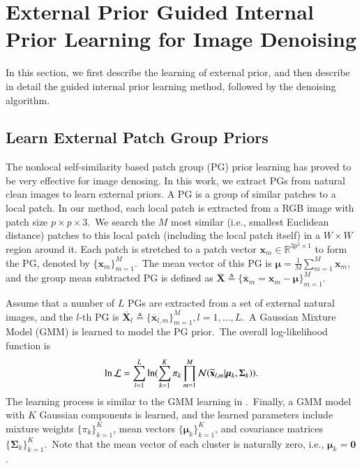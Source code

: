 \section{External Prior Guided Internal Prior Learning for Image Denoising}

In this section, we first describe the learning of external prior, and then describe in detail the guided internal prior learning method, followed by the denoising algorithm.

\subsection{Learn External Patch Group Priors}

The nonlocal self-similarity based patch group (PG) prior learning \cite{pgpd} has proved to be very effective for image denosing. In this work, we extract PGs from natural clean images to learn external priors. A PG is a group of similar patches to a local patch. In our method, each local patch is extracted from a RGB image with patch size $p\times p \times 3$.\ We search the $M$ most similar (i.e., smallest Euclidean distance) patches to this local patch (including the local patch itself) in a $W\times W$ region around it. Each patch is stretched to a patch vector $\mathbf{x}_{m}\in \mathbb{R}^{3p^{2}\times1}$ to form the PG, denoted by $\{\mathbf{x}_{m}\}_{m=1}^{M}$.\ The mean vector of this PG is $\bm{\mu}=\frac{1}{M}\sum_{m=1}^{M}\mathbf{x}_{m}$, and the group mean subtracted PG is defined as $\mathbf{\overline{X}}\triangleq \{\mathbf{\overline{x}}_{m}=\mathbf{x}_{m}-\bm{\mu}\}_{m=1}^{M}$.

Assume that a number of $L$ PGs are extracted from a set of external natural images, and the $l$-th PG is $\mathbf{\overline{X}}_{l}\triangleq \{\mathbf{\overline{x}}_{l,m}\}_{m=1}^{M}, l=1,...,L$.\ A Gaussian Mixture Model (GMM) is learned to model the PG prior.\ The overall log-likelihood function is
\vspace{-2mm}
\begin{equation}\label{equ3-1}
\vspace{-2mm}
\begin{split}
\ln\mathcal{L}=\sum_{l=1}^{L} \ln(\sum_{k=1}^{K}\pi_{k}\prod_{m=1}^{M}\mathcal{N}(\mathbf{\overline{x}}_{l,m}|\bm{\mu}_{k},\bm{\Sigma}_{k})).
\end{split}
\end{equation}
The learning process is similar to the GMM learning in \cite{pgpd,epll}.\ Finally, a GMM model with $K$ Gaussian components is learned, and the learned parameters include mixture weights $\{\pi_{k}\}_{k=1}^{K}$, mean vectors $\{\bm{\mu}_{k}\}_{k=1}^{K}$, and covariance matrices $\{\bm{\Sigma}_{k}\}_{k=1}^{K}$.\ Note that the mean vector of each cluster is naturally zero, i.e., $\bm{\mu}_{k}=\bm{0}$.  

